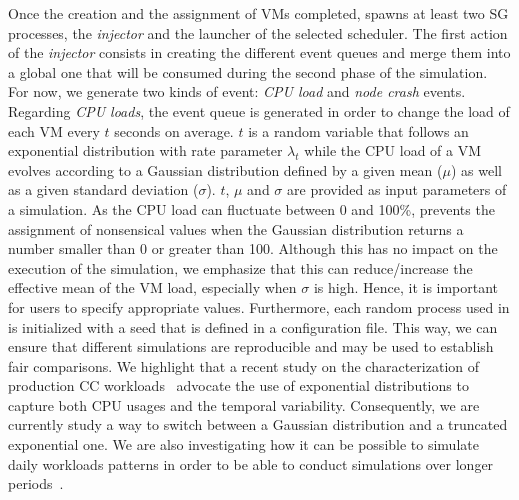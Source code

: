 Once the creation and the assignment of VMs completed, \vmps spawns at
least two SG processes, the \emph{injector} and the launcher of the
selected scheduler.  The first action of the \emph{injector} consists
in creating the different event queues and merge them into a global
one that will be consumed during the second phase of the simulation.
For now, we generate two kinds of event: \emph{CPU load} and
\emph{node crash} events.
%
Regarding \emph{CPU loads}, the event queue is generated in order to change the
load of each VM every $t$ seconds on average. $t$ is a random variable
that follows an exponential distribution with rate parameter
$\lambda_t$ while the CPU load of a VM evolves according to a Gaussian
distribution defined by a given mean ($\mu$) as well as a given
standard deviation ($\sigma$). $t$, $\mu$ and $\sigma$ are provided as
input parameters of a simulation. As the CPU load can fluctuate
between 0 and 100\%, \vmps prevents the assignment of nonsensical
values when the Gaussian distribution returns a number smaller than 0
or greater than 100. Although this has no impact on the execution of
the simulation, we emphasize that this can reduce/increase the
effective mean of the VM load, especially when $\sigma$ is high.
Hence, it is important for users to specify appropriate values.
Furthermore, each random process used in \vmps is initialized with a
seed that is defined in a configuration file. This way, we can ensure
that different simulations are reproducible and may be used to
establish fair comparisons.
We highlight that a recent study on the characterization of production CC
workloads~\cite{birke:nom2014} advocate the use of exponential
distributions to capture both CPU usages and the temporal variability.
Consequently, we are currently study a way to switch between a
Gaussian distribution and a truncated exponential one. We are also
investigating how it can be possible to simulate daily workloads
patterns in order to be able to conduct simulations over longer
periods~\cite{shen:ccgrid2015}.

